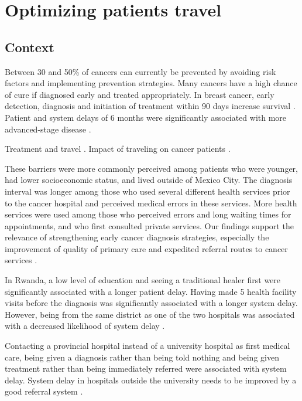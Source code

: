 \chapter{Optimizing patients travel}

\section{Context}

Between 30 and 50\% of cancers can currently be prevented by avoiding risk factors and implementing prevention strategies. Many cancers have a high chance of cure if diagnosed early and treated appropriately.
In breast cancer, early detection, diagnosis and initiation of treatment within 90 days increase survival \cite{williams_assessment_2015}. Patient and system delays of 6 months were significantly associated with more advanced-stage disease \cite{pace_delays_2015}.

Treatment and travel \cite{weiss_global_2020,brundisini_chronic_2013,kelly_are_2016,salerno_understanding_2022}.
Impact of traveling on cancer patients \cite{payne_impact_2000,flytkjaer_virgilsen_cancer_2019,virgilsen_travel_2019,payne_impact_2000,ambroggi_distance_2015}.

These barriers were more commonly perceived among patients who were younger, had lower socioeconomic status, and lived outside of Mexico City. The diagnosis interval was longer among those who used several different health services prior to the cancer hospital and perceived medical errors in these services. More health services were used among those who perceived errors and long waiting times for appointments, and who first consulted private services. Our findings support the relevance of strengthening early cancer diagnosis strategies, especially the improvement of quality of primary care and expedited referral routes to cancer services \cite{unger-saldana_barriers_2018}.

In Rwanda, a low level of education and seeing a traditional healer first were significantly associated with a longer patient delay. Having made 5 health facility visits before the diagnosis was significantly associated with a longer system delay. However, being from the same district as one of the two hospitals was associated with a decreased likelihood of system delay \cite{pace_delays_2015}.

Contacting a provincial hospital instead of a university hospital as first medical care, being given a diagnosis rather than being told nothing and being given treatment rather than being immediately referred were associated with system delay. System delay in hospitals outside the university needs to be improved by a good referral system \cite{thongsuksai_delay_2000}.

